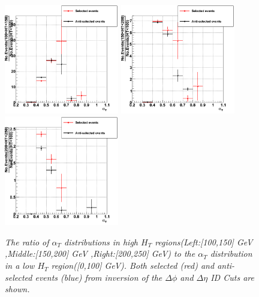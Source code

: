 \documentclass{article}
\begin{document}
\begin{figure}[h!]

\includegraphics[width=50mm]{ratio1.png}
\includegraphics[width=50mm]{ratio2.png}
\includegraphics[width=50mm]{ratio3.png}

\caption{\textit{The ratio of $\alpha_{T}$ distributions in high $H_{T}$ regions(Left:[100,150] GeV ,Middle:[150,200] GeV ,Right:[200,250] GeV) to the $\alpha_{T}$ distribution in a low $H_{T}$ region([0,100] GeV). Both selected (red) and anti-selected events (blue) from inversion of the $\Delta \phi$ and $\Delta \eta$ ID Cuts are shown.}}
\label{fig:HTratios}
\end{figure}
\end{document}
